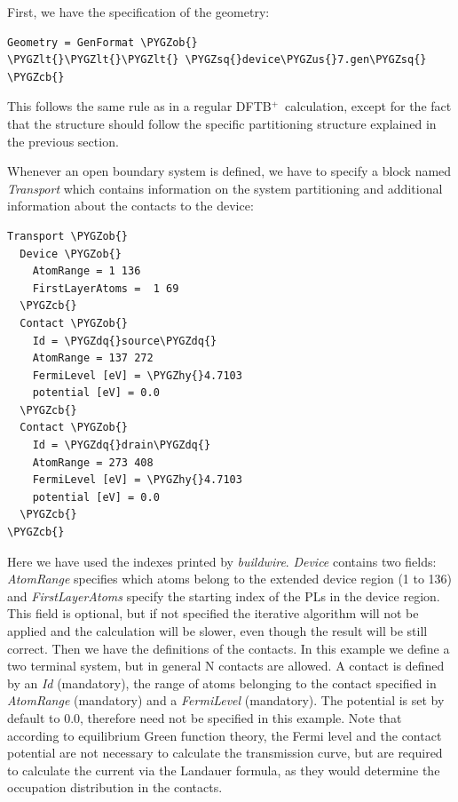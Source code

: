 \documentclass[a4paper,11pt,english]{sphinxmanual}
\newcommand{\dftbp}{\textsf{DFTB$^{\text{+}}$\ }} %
\def\PYGZus{\char`\_}
\def\PYGZob{\char`\{}
\def\PYGZcb{\char`\}}
\def\PYGZlt{\char`\<}
\def\PYGZhy{\char`\-}
\def\PYGZsq{\char`\'}
\def\PYGZdq{\char`\"}
\renewcommand\PYGZsq{\textquotesingle}
\begin{document}
{{First, we have the specification of the geometry:

\begin{Verbatim}[commandchars=\\\{\}]
Geometry = GenFormat \PYGZob{}
\PYGZlt{}\PYGZlt{}\PYGZlt{} \PYGZsq{}device\PYGZus{}7.gen\PYGZsq{}
\PYGZcb{}
\end{Verbatim}

This follows the same rule as in a regular \dftbp calculation, except
for the fact that the structure should follow the specific
partitioning structure explained in the previous section.

Whenever an open boundary system is defined, we have to specify a
block named \emph{Transport} which contains information on the system
partitioning and additional information about the contacts to the
device:

\begin{Verbatim}[commandchars=\\\{\}]
Transport \PYGZob{}
  Device \PYGZob{}
    AtomRange = 1 136
    FirstLayerAtoms =  1 69
  \PYGZcb{}
  Contact \PYGZob{}
    Id = \PYGZdq{}source\PYGZdq{}
    AtomRange = 137 272
    FermiLevel [eV] = \PYGZhy{}4.7103
    potential [eV] = 0.0
  \PYGZcb{}
  Contact \PYGZob{}
    Id = \PYGZdq{}drain\PYGZdq{}
    AtomRange = 273 408
    FermiLevel [eV] = \PYGZhy{}4.7103
    potential [eV] = 0.0
  \PYGZcb{}
\PYGZcb{}
\end{Verbatim}

Here we have used the indexes printed by \emph{buildwire}. \emph{Device}
contains two fields: \emph{AtomRange} specifies which atoms belong to the
extended device region (1 to 136) and \emph{FirstLayerAtoms} specify the
starting index of the PLs in the device region. This field is
optional, but if not specified the iterative algorithm will not be
applied and the calculation will be slower, even though the result
will be still correct.  Then we have the definitions of the
contacts. In this example we define a two terminal system, but in
general N contacts are allowed. A contact is defined by an \emph{Id}
(mandatory), the range of atoms belonging to the contact specified in
\emph{AtomRange} (mandatory) and a \emph{FermiLevel} (mandatory). The potential
is set by default to 0.0, therefore need not be specified in this
example. Note that according to equilibrium Green function theory,
the Fermi level and the contact potential are not necessary to
calculate the transmission curve, but are required to calculate the
current via the Landauer formula, as they would determine the
occupation distribution in the contacts.

}}
\end{document}
